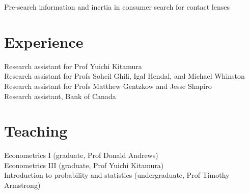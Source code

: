 \documentclass[11pt]{article} %
\begin{document}
Pre-search information and inertia in consumer search for contact lenses

\section*{Experience}

 Research assistant for Prof Yuichi Kitamura \\
 Research assistant for Profs Soheil Ghili, Igal Hendal, and Michael Whinston \\
  Research assistant for Profs Matthew Gentzkow and Jesse Shapiro \\
 Research assistant, Bank of Canada \\

\section*{Teaching}

 Econometrics I (graduate, Prof Donald Andrews) \\
 Econometrics III (graduate, Prof Yuichi Kitamura) \\
 Introduction to probability and statistics (undergraduate, Prof Timothy Armstrong)



\vfill %
\end{document}
